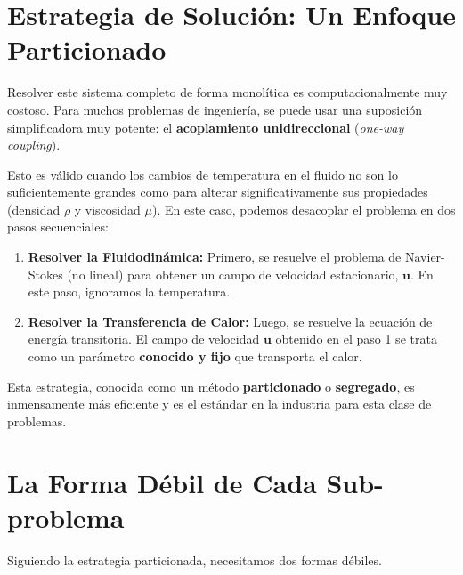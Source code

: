 \section{Estrategia de Solución: Un Enfoque Particionado}
\label{sec:convection-strategy}
Resolver este sistema completo de forma monolítica es computacionalmente muy costoso. Para muchos problemas de ingeniería, se puede usar una suposición simplificadora muy potente: el \textbf{acoplamiento unidireccional} (\textit{one-way coupling}).

Esto es válido cuando los cambios de temperatura en el fluido no son lo suficientemente grandes como para alterar significativamente sus propiedades (densidad \(\rho\) y viscosidad \(\mu\)). En este caso, podemos desacoplar el problema en dos pasos secuenciales:
\begin{enumerate}
    \item \textbf{Resolver la Fluidodinámica:} Primero, se resuelve el problema de Navier-Stokes (no lineal) para obtener un campo de velocidad estacionario, \(\bm{u}\). En este paso, ignoramos la temperatura.
    \item \textbf{Resolver la Transferencia de Calor:} Luego, se resuelve la ecuación de energía transitoria. El campo de velocidad \(\bm{u}\) obtenido en el paso 1 se trata como un parámetro \textbf{conocido y fijo} que transporta el calor.
\end{enumerate}
Esta estrategia, conocida como un método \textbf{particionado} o \textbf{segregado}, es inmensamente más eficiente y es el estándar en la industria para esta clase de problemas.

\section{La Forma Débil de Cada Sub-problema}
\label{sec:convection-weak}
Siguiendo la estrategia particionada, necesitamos dos formas débiles.

